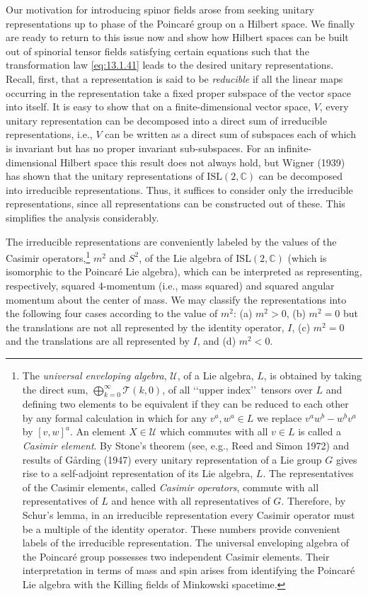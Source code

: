 Our motivation for introducing spinor fields arose from seeking unitary
representations up to phase of the Poincar\'e group on a Hilbert space. We finally are
ready to return to this issue now and show how Hilbert spaces can be built out of
spinorial tensor fields satisfying certain equations such that the transformation law
\eqref{eq:13.1.41} leads to the desired unitary representations. Recall, first, that
a representation is said to be \emph{reducible} if all the linear maps occurring in
the representation take a fixed proper subspace of the vector space into itself. It
is easy to show that on a finite-dimensional vector space, \(V\), every unitary
representation can be decomposed into a direct sum of irreducible representations,
i.e., \(V\) can be written as a direct sum of subspaces each of which is invariant
but has no proper invariant sub-subspaces. For an infinite-dimensional Hilbert space
this result does not always hold, but Wigner (1939) has shown that the unitary
representations of \(\mathrm{ISL}(2,\mathbb C)\) can be decomposed into irreducible
representations. Thus, it suffices to consider only the irreducible representations,
since all representations can be constructed out of these. This simplifies the
analysis considerably.

The irreducible representations are conveniently labeled by the values of the Casimir
operators,\footnote{The \emph{universal enveloping algebra}, \(\mathcal U\), of a Lie
algebra, \(L\), is obtained by taking the direct sum,
\(\bigoplus_{k=0}^\infty\mathcal T(k,0)\), of all \lq\lq upper index\rq\rq\ tensors
over \(L\) and defining two elements to be equivalent if they can be reduced to each
other by any formal calculation in which for any \(v^a,w^a\in L\) we replace
\(v^aw^b-w^bv^a\) by \([v,w]^a\). An element \(X\in\mathcal U\) which commutes with
all \(v\in L\) is called a \emph{Casimir element}. By Stone's theorem (see, e.g.,
Reed and Simon 1972) and results of G\aa rding (1947) every unitary representation
of a Lie group \(G\) gives rise to a self-adjoint representation of its Lie algebra,
\(L\). The representatives of the Casimir elements, called \emph{Casimir operators},
commute with all representatives of \(L\) and hence with all representatives of
\(G\). Therefore, by Schur's lemma, in an irreducible representation every Casimir
operator must be a multiple of the identity operator. These numbers provide
convenient labels of the irreducible representation. The universal enveloping algebra
of the Poincar\'e group possesses two independent Casimir elements. Their
interpretation in terms of mass and spin arises from identifying the Poincar\'e Lie
algebra with the Killing fields of Minkowski spacetime.} \(m^2\) and \(S^2\), of the
Lie algebra of \(\mathrm{ISL}(2,\mathbb C)\) (which is isomorphic to the Poincar\'e
Lie algebra), which can be interpreted as representing, respectively, squared
4-momentum (i.e., mass squared) and squared angular momentum about the center of
mass. We may classify the representations into the following four cases according to
the value of \(m^2\): (a) \(m^2>0\), (b) \(m^2=0\) but the translations are not all
represented by the identity operator, \(I\), (c) \(m^2=0\) and the translations are
all represented by \(I\), and (d) \(m^2<0\).

